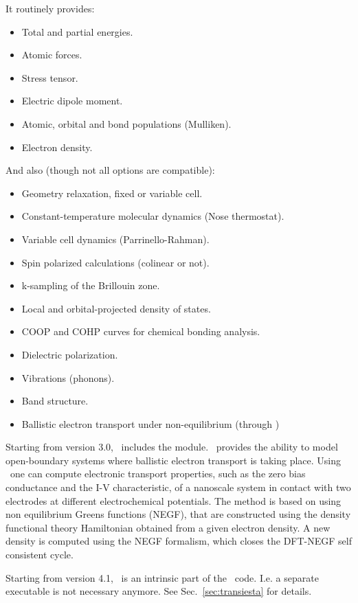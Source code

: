 It routinely provides:
\begin{itemize}
  \item Total and partial energies.
  \item Atomic forces.
  \item Stress tensor.
  \item Electric dipole moment.
  \item Atomic, orbital and bond populations (Mulliken).
  \item Electron density.
\end{itemize}

And also (though not all options are compatible):
\begin{itemize}
  \item Geometry relaxation, fixed or variable cell.
  \item Constant-temperature molecular dynamics (Nose thermostat).
  \item Variable cell dynamics (Parrinello-Rahman).
  \item Spin polarized calculations (colinear or not).
  \item k-sampling of the Brillouin zone.
  \item Local and orbital-projected density of states.
  \item COOP and COHP curves for chemical bonding analysis.
  \item Dielectric polarization.
  \item Vibrations (phonons).
  \item Band structure.
  \item Ballistic electron transport under non-equilibrium (through \tsiesta)
\end{itemize}


Starting from version 3.0, \siesta\ includes the \tsiesta{}
module. \tsiesta\ provides the ability to model open-boundary systems where ballistic
electron transport is taking place.  Using \tsiesta\ one can compute electronic
transport properties, such as the zero bias conductance and the I-V characteristic, of a
nanoscale system in contact with two electrodes at different electrochemical potentials.
The method is based on using non equilibrium Greens functions (NEGF), that are
constructed using the density functional theory Hamiltonian obtained from a given electron
density. A new density is computed using the NEGF formalism, which closes the DFT-NEGF
self consistent cycle.

Starting from version 4.1, \tsiesta\ is an intrinsic part of the
\siesta\ code. I.e. a separate executable is not necessary
anymore. See Sec.~\ref{sec:transiesta} for details.

